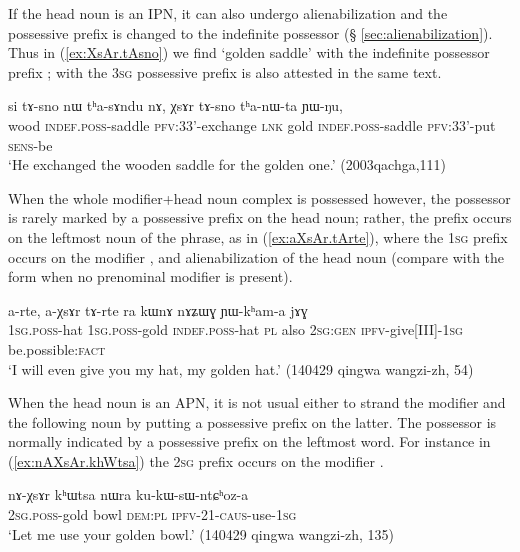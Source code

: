 If the head noun is an IPN, it can also undergo alienabilization and the possessive prefix is changed to the indefinite possessor (§ \ref{sec:alienabilization}). Thus in (\ref{ex:XsAr.tAsno}) we find  `golden saddle' with the indefinite possessor prefix ;  with the \textsc{3sg} possessive prefix is also attested in the same text.

\begin{exe}
\ex \label{ex:XsAr.tAsno}
\gll si tɤ-sno nɯ tʰa-sɤndu nɤ, χsɤr tɤ-sno tʰa-nɯ-ta ɲɯ-ŋu, \\
wood \textsc{indef}.\textsc{poss}-saddle \textsc{pfv}:3\fl{}3'-exchange \textsc{lnk} gold  \textsc{indef}.\textsc{poss}-saddle \textsc{pfv}:3\fl{}3'-put \textsc{sens}-be \\
\glt `He exchanged the wooden saddle for the golden one.' (2003qachga,111)
\end{exe}

When the whole modifier+head noun complex is possessed however, the possessor is rarely marked by a possessive prefix on the head noun; rather, the prefix occurs on the leftmost noun of the phrase, as in (\ref{ex:aXsAr.tArte}), where the \textsc{1sg} prefix  occurs on the modifier , and alienabilization of the head noun  (compare with the form  when no prenominal modifier is present). %

\begin{exe}
\ex \label{ex:aXsAr.tArte}
\gll a-rte, a-χsɤr tɤ-rte ra kɯnɤ nɤʑɯɣ ɲɯ-kʰam-a jɤɣ \\
\textsc{1sg}.\textsc{poss}-hat \textsc{1sg}.\textsc{poss}-gold \textsc{indef}.\textsc{poss}-hat \textsc{pl} also \textsc{2sg:gen} \textsc{ipfv}-give[III]-\textsc{1sg} be.possible:\textsc{fact} \\
\glt `I will even give you my hat, my golden hat.' (140429 qingwa wangzi-zh, 54)
\end{exe}

When the head noun is an APN, it is not usual either to strand the modifier and the following noun by putting a possessive prefix on the latter. The possessor is normally indicated by a possessive prefix on the leftmost word. For instance in (\ref{ex:nAXsAr.khWtsa}) the \textsc{2sg} prefix  occurs on the modifier .

\begin{exe}
\ex \label{ex:nAXsAr.khWtsa}
\gll nɤ-χsɤr kʰɯtsa nɯra ku-kɯ-sɯ-ntɕʰoz-a \\
\textsc{2sg}.\textsc{poss}-gold bowl \textsc{dem}:\textsc{pl} \textsc{ipfv}-2\fl{}1-\textsc{caus}-use-\textsc{1sg} \\
\glt `Let me use your golden bowl.' (140429 qingwa wangzi-zh, 135)
\end{exe}

